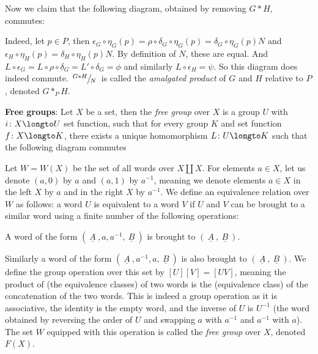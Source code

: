 Now we claim that the following diagram, obtained by removing $G*H$, commutes:

\medskip
\centerline{\def\diagcolwidth{1cm}\def\diagrowheight{.75cm}}

Indeed, let $p\in P$, then $\epsilon_G\circ\eta_G(p)=\rho\circ\delta_G\circ\eta_G(p)=\delta_G\circ\eta_G(p)N$ and $\epsilon_H\circ\eta_H(p)=\delta_H\circ\eta_H(p)N$.
By definition of $N$, these are equal.
And $L\circ\epsilon_G=L\circ\rho\circ\delta_G=L'\circ\delta_G=\phi$ and similarly $L\circ\epsilon_H=\psi$.
So this diagram does indeed commute.
$\slfrac{G*H}N$ is called the {\it amalgated product} of $G$ and $H$ relative to $P$, denoted $G*_PH$.

\medskip
{\bf Free groups}:
Let $X$ be a set, then the {\it free group} over $X$ is a group $U$ with $i\colon X\longto U$ set function, such that for every group $K$ and set function $f\colon X\longto K$, there exists a unique
homomorphism $L\colon U\longto K$ such that the following diagram commutes

\medskip
\centerline{\def\diagcolwidth{1cm}\def\diagrowheight{.75cm}}

Let $W=W(X)$ be the set of all words over $X\coprod X$.
For elements $a\in X$, let us denote $(a,0)$ by $a$ and $(a,1)$ by $a^{-1}$, meaning we denote elements $a\in X$ in the left $X$ by $a$ and in the right $X$ by $a^{-1}$.
We define an equivalence relation over $W$ as follows: a word $U$ is equivalent to a word $V$ if $U$ and $V$ can be brought to a similar word using a finite number of the following operations:
\benum
    \item A word of the form $(\underline{\ A\ },a,a^{-1},\underline{\ B\ })$ is brought to $(\underline{\ A\ },\underline{\ B\ })$.
    \item Similarly a word of the form $(\underline{\ A\ },a^{-1},a,\underline{\ B\ })$ is also brought to $(\underline{\ A\ },\underline{\ B\ })$.
\eenum
We define the group operation over this set by $[U][V]=[UV]$, meaning the product of (the equivalence classes) of two words is the (equivalence class) of the concatenation of the two words.
This is indeed a group operation as it is associative, the identity is the empty word, and the inverse of $U$ is $U^{-1}$ (the word obtained by reversing the order of $U$ and swapping $a$ with $a^{-1}$ and
$a^{-1}$ with $a$).
The set $W$ equipped with this operation is called the {\it free group} over $X$, denoted $F(X)$.


